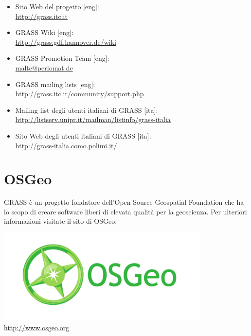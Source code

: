 \documentclass[notumble,a4paper,10pt,nofoldmark]{leaflet}
\newcommand{\GRASSurl}{\url{http://grass.itc.it}}
\begin{document}
\begin{itemize}
\item{Sito Web del progetto [eng]: \\\GRASSurl}
\item{GRASS Wiki  [eng]: \\\url{http://grass.gdf.hannover.de/wiki}}
\item{GRASS Promotion Team  [eng]: \\\url{malte@perlomat.de}}
\item{GRASS mailing lists  [eng]: \\\url{http://grass.itc.it/community/support.php}}
\item{Mailing list degli utenti italiani di GRASS  [ita]: \\\url{http://listserv.unipr.it/mailman/listinfo/grass-italia}}
\item{Sito Web degli utenti italiani di GRASS [ita]: \\\url{http://grass-italia.como.polimi.it/}}
\end{itemize}

\vfill
\section{OSGeo}

GRASS \`e un progetto fondatore dell'Open Source Geospatial Foundation che ha lo scopo di creare software liberi di elevata qualit\`a per la geoscienza. Per ulteriori informazioni visitate il sito di OSGeo:
\begin{center}
\includegraphics[width=0.8\textwidth]{OSGeo_CMYK}\\
\url{http://www.osgeo.org}
\end{center}
\end{document}
